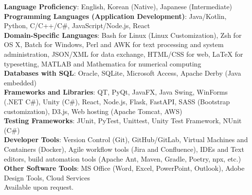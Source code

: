 \textbf{Language Proficiency}: English, Korean (Native), Japanese (Intermediate)\\
\textbf{Programming Languages (Application Development)}: Java/Kotlin, Python, C/C++/C\#, JavaScript/Node.js, React\\
\textbf{Domain-Specific Languages}: Bash for Linux (Linux Customization), Zsh for OS X, Batch for Windows, 
Perl and AWK for text processing and system administration, 
JSON/XML for data exchange, 
HTML/CSS for web, LaTeX for typesetting, MATLAB and Mathematica for numerical computing\\
\textbf{Databases with SQL}: Oracle, SQLite, Microsoft Access, Apache Derby (Java embedded)\\
\textbf{Frameworks and Libraries}: QT, PyQt, JavaFX, Java Swing, WinForms (.NET C\#), Unity (C\#), 
React, Node.js, Flask, FastAPI, SASS (Bootstrap customization), D3.js, Web hosting (Apache Tomcat, AWS)\\
\textbf{Testing Frameworks}: JUnit, 
PyTest, Unittest, Unity Test Framework, NUnit (C\#)\\
\textbf{Developer Tools}: Version Control (Git), 
GitHub/GitLab, Virtual Machines and Containers (Docker), 
Agile workflow tools (Jira and Confluence), IDEs and Text editors,
build automation tools (Apache Ant, Maven, Gradle, Poetry, npx, etc.)\\
\textbf{Other Software Tools}: MS Office (Word, Excel, PowerPoint, Outlook), 
Adobe Design Tools, Cloud Services \\ 
\newline
Available upon request.

